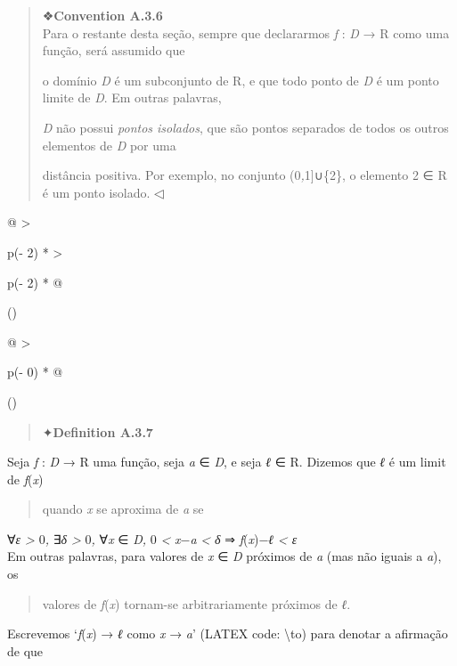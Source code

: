 \documentclass[
]{article}
\begin{document}
\begin{quote}
❖\textbf{Convention A.3.6}\\
Para o restante desta seção, sempre que declararmos \emph{f} : \emph{D}
→ R como uma função, será assumido que

o domínio \emph{D} é um subconjunto de R, e que todo ponto de \emph{D} é
um ponto limite de \emph{D}. Em outras palavras,

\emph{D} não possui \emph{pontos isolados}, que são pontos separados de
todos os outros elementos de \emph{D} por uma

distância positiva. Por exemplo, no conjunto (0\emph{,}1{]}∪\{2\}, o
elemento 2 ∈ R é um ponto isolado. ◁
\end{quote}

\begin{longtable}[]{@{}
  >{\raggedright\arraybackslash}p{(\columnwidth - 2\tabcolsep) * }
  >{\raggedright\arraybackslash}p{(\columnwidth - 2\tabcolsep) * }@{}}
\toprule()
\begin{minipage}[b]{\linewidth}\raggedright
\begin{longtable}[]{@{}
  >{\raggedright\arraybackslash}p{(\columnwidth - 0\tabcolsep) * }@{}}
\toprule()
\begin{minipage}[b]{\linewidth}\raggedright
\begin{quote}
✦\textbf{Definition A.3.7}
\end{quote}

Seja \emph{f} : \emph{D} → R uma função, seja \emph{a} ∈ \emph{D}, e
seja \emph{ℓ} ∈ R. Dizemos que \emph{ℓ} é um limit de \emph{f}(\emph{x})

\begin{quote}
quando \emph{x} se aproxima de \emph{a} se
\end{quote}

∀\emph{ε \textgreater{}} 0\emph{,} ∃\emph{δ \textgreater{}} 0\emph{,}
∀\emph{x} ∈ \emph{D,} 0 \emph{\textless{}}
\textbar{}\emph{x}−\emph{a}\textbar{} \emph{\textless{} δ} ⇒
\textbar{}\emph{f}(\emph{x})−\emph{ℓ}\textbar{} \emph{\textless{} ε}\\
Em outras palavras, para valores de \emph{x} ∈ \emph{D} próximos de
\emph{a} (mas não iguais a \emph{a}), os

\begin{quote}
valores de \emph{f}(\emph{x}) tornam-se arbitrariamente próximos de
\emph{ℓ}.
\end{quote}

Escrevemos `\emph{f}(\emph{x}) → \emph{ℓ} como \emph{x} → \emph{a}'
(LATEX code: \textbackslash to) para denotar a afirmação de que


\end{minipage}
\end{longtable}
\end{minipage}
\end{longtable}
\end{document}
